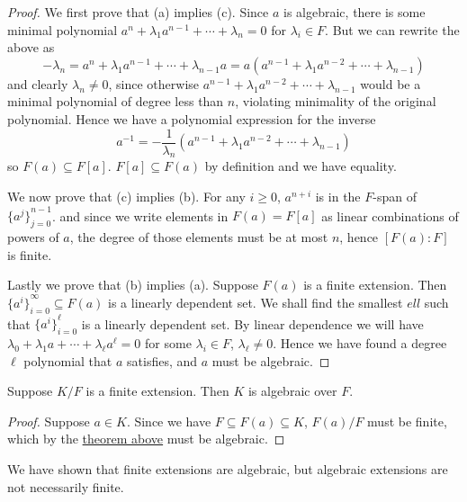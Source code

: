 \begin{proof}
    We first prove that (a) implies (c).
    Since \(a\) is algebraic, there is some minimal polynomial
    \(a^n + \lambda_1 a^{n-1} + \cdots + \lambda_n = 0\) for \(\lambda_i \in F\).
    But we can rewrite the above as
    \begin{equation*}
        -\lambda_n = a^n + \lambda_1 a^{n-1} + \cdots + \lambda_{n-1}a
        = a(a^{n-1} + \lambda_1 a^{n-2} + \cdots + \lambda_{n-1})
    \end{equation*}
    and clearly \(\lambda_n \neq 0\),
    since otherwise \(a^{n-1} + \lambda_1 a^{n-2} + \cdots + \lambda_{n-1}\)
    would be a minimal polynomial of degree less than \(n\),
    violating minimality of the original polynomial.
    Hence we have a polynomial expression for the inverse
    \begin{equation*}
        a^{-1} = -\frac{1}{\lambda_n}
        (a^{n-1} + \lambda_1 a^{n-2} + \cdots + \lambda_{n-1})
    \end{equation*}
    so \(F(a) \subseteq F[a]\).
    \(F[a] \subseteq F(a)\) by definition
    and we have equality.
    
    We now prove that (c) implies (b).
    For any \(i \geq 0\), \(a^{n+i}\) is in the \(F\)-span of \({\{a^j\}}_{j=0}^{n-1}\).
    and since we write elements in \(F(a) = F[a]\)
    as linear combinations of powers of \(a\),
    the degree of those elements must be at most \(n\),
    hence \([F(a):F]\) is finite.

    Lastly we prove that (b) implies (a).
    Suppose \(F(a)\) is a finite extension.
    Then \({\{a^i\}}_{i=0}^\infty \subseteq F(a)\) is a linearly dependent set.
    We shall find the smallest \(ell\) such that
    \({\{a^i\}}_{i=0}^\ell\) is a linearly dependent set.
    By linear dependence we will have
    \(\lambda_0 + \lambda_1 a + \cdots + \lambda_\ell a^\ell = 0\)
    for some \(\lambda_i \in F\), \(\lambda_\ell \neq 0\).
    Hence we have found a degree \(\ell\) polynomial that \(a\) satisfies,
    and \(a\) must be algebraic.
\end{proof}
\begin{corollary}\label{cor:algebraic-finite-extension}
    Suppose \(K/F\) is a finite extension.
    Then \(K\) is algebraic over \(F\).
\end{corollary}
\begin{proof}
    Suppose \(a \in K\).
    Since we have \(F \subseteq F(a) \subseteq K\),
    \(F(a)/F\) must be finite,
    which by the \hyperref[thm:algebraic-finite-extension]{theorem above}
    must be algebraic.
\end{proof}
\begin{remark}
    We have shown that finite extensions are algebraic,
    but algebraic extensions are not necessarily finite.
\end{remark}

